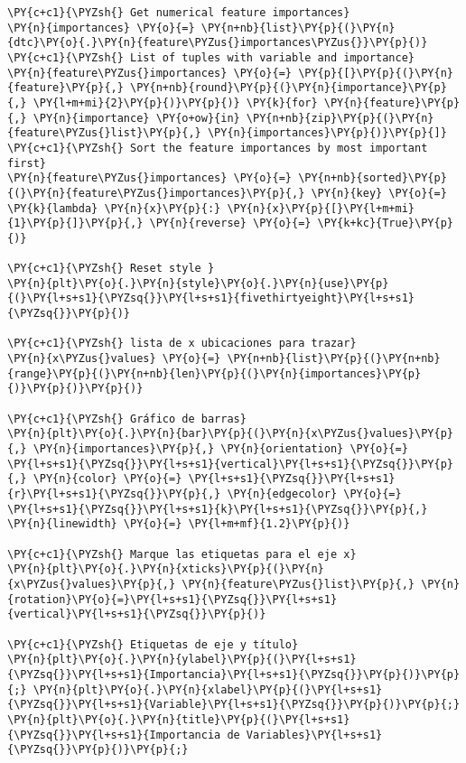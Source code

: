     \begin{tcolorbox}[breakable, size=fbox, boxrule=1pt, pad at break*=1mm,colback=cellbackground, colframe=cellborder]
\begin{Verbatim}[commandchars=\\\{\}]
\PY{c+c1}{\PYZsh{} Get numerical feature importances}
\PY{n}{importances} \PY{o}{=} \PY{n+nb}{list}\PY{p}{(}\PY{n}{dtc}\PY{o}{.}\PY{n}{feature\PYZus{}importances\PYZus{}}\PY{p}{)}
\PY{c+c1}{\PYZsh{} List of tuples with variable and importance}
\PY{n}{feature\PYZus{}importances} \PY{o}{=} \PY{p}{[}\PY{p}{(}\PY{n}{feature}\PY{p}{,} \PY{n+nb}{round}\PY{p}{(}\PY{n}{importance}\PY{p}{,} \PY{l+m+mi}{2}\PY{p}{)}\PY{p}{)} \PY{k}{for} \PY{n}{feature}\PY{p}{,} \PY{n}{importance} \PY{o+ow}{in} \PY{n+nb}{zip}\PY{p}{(}\PY{n}{feature\PYZus{}list}\PY{p}{,} \PY{n}{importances}\PY{p}{)}\PY{p}{]}
\PY{c+c1}{\PYZsh{} Sort the feature importances by most important first}
\PY{n}{feature\PYZus{}importances} \PY{o}{=} \PY{n+nb}{sorted}\PY{p}{(}\PY{n}{feature\PYZus{}importances}\PY{p}{,} \PY{n}{key} \PY{o}{=} \PY{k}{lambda} \PY{n}{x}\PY{p}{:} \PY{n}{x}\PY{p}{[}\PY{l+m+mi}{1}\PY{p}{]}\PY{p}{,} \PY{n}{reverse} \PY{o}{=} \PY{k+kc}{True}\PY{p}{)}

\PY{c+c1}{\PYZsh{} Reset style }
\PY{n}{plt}\PY{o}{.}\PY{n}{style}\PY{o}{.}\PY{n}{use}\PY{p}{(}\PY{l+s+s1}{\PYZsq{}}\PY{l+s+s1}{fivethirtyeight}\PY{l+s+s1}{\PYZsq{}}\PY{p}{)}

\PY{c+c1}{\PYZsh{} lista de x ubicaciones para trazar}
\PY{n}{x\PYZus{}values} \PY{o}{=} \PY{n+nb}{list}\PY{p}{(}\PY{n+nb}{range}\PY{p}{(}\PY{n+nb}{len}\PY{p}{(}\PY{n}{importances}\PY{p}{)}\PY{p}{)}\PY{p}{)}

\PY{c+c1}{\PYZsh{} Gráfico de barras}
\PY{n}{plt}\PY{o}{.}\PY{n}{bar}\PY{p}{(}\PY{n}{x\PYZus{}values}\PY{p}{,} \PY{n}{importances}\PY{p}{,} \PY{n}{orientation} \PY{o}{=} \PY{l+s+s1}{\PYZsq{}}\PY{l+s+s1}{vertical}\PY{l+s+s1}{\PYZsq{}}\PY{p}{,} \PY{n}{color} \PY{o}{=} \PY{l+s+s1}{\PYZsq{}}\PY{l+s+s1}{r}\PY{l+s+s1}{\PYZsq{}}\PY{p}{,} \PY{n}{edgecolor} \PY{o}{=} \PY{l+s+s1}{\PYZsq{}}\PY{l+s+s1}{k}\PY{l+s+s1}{\PYZsq{}}\PY{p}{,} \PY{n}{linewidth} \PY{o}{=} \PY{l+m+mf}{1.2}\PY{p}{)}

\PY{c+c1}{\PYZsh{} Marque las etiquetas para el eje x}
\PY{n}{plt}\PY{o}{.}\PY{n}{xticks}\PY{p}{(}\PY{n}{x\PYZus{}values}\PY{p}{,} \PY{n}{feature\PYZus{}list}\PY{p}{,} \PY{n}{rotation}\PY{o}{=}\PY{l+s+s1}{\PYZsq{}}\PY{l+s+s1}{vertical}\PY{l+s+s1}{\PYZsq{}}\PY{p}{)}

\PY{c+c1}{\PYZsh{} Etiquetas de eje y título}
\PY{n}{plt}\PY{o}{.}\PY{n}{ylabel}\PY{p}{(}\PY{l+s+s1}{\PYZsq{}}\PY{l+s+s1}{Importancia}\PY{l+s+s1}{\PYZsq{}}\PY{p}{)}\PY{p}{;} \PY{n}{plt}\PY{o}{.}\PY{n}{xlabel}\PY{p}{(}\PY{l+s+s1}{\PYZsq{}}\PY{l+s+s1}{Variable}\PY{l+s+s1}{\PYZsq{}}\PY{p}{)}\PY{p}{;} \PY{n}{plt}\PY{o}{.}\PY{n}{title}\PY{p}{(}\PY{l+s+s1}{\PYZsq{}}\PY{l+s+s1}{Importancia de Variables}\PY{l+s+s1}{\PYZsq{}}\PY{p}{)}\PY{p}{;}
\end{Verbatim}
\end{tcolorbox}

